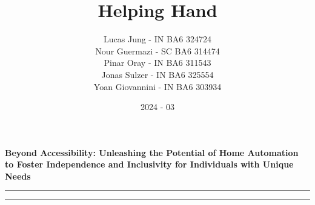 \documentclass[12pt, a4paper, openany]{article}
\title{Helping Hand}
\author{Lucas Jung - IN BA6 324724\\Nour Guermazi - SC BA6 314474\\Pinar Oray - IN BA6 311543\\Jonas Sulzer - IN BA6 325554\\Yoan Giovannini - IN BA6 303934}
\date{2024 - 03}
\begin{document}
\maketitle
\thispagestyle{fancy}

\begin{center}
    \textbf{Beyond Accessibility: Unleashing the Potential of Home Automation to Foster Independence and Inclusivity for Individuals with Unique Needs}
\end{center}

\par\noindent\rule{\textwidth}{0.4pt}
\vspace{-20pt}
\tableofcontents
\par\noindent\rule{\textwidth}{0.4pt}

\vspace{10pt}


\newpage

\newpage

\end{document}
